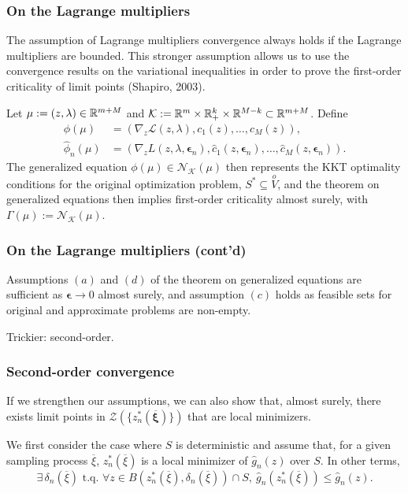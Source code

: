 \documentclass{beamer}
\def\bxi{\boldsymbol\xi}
\def\bepsilon{\boldsymbol\epsilon}
\begin{document}
\begin{frame}
\frametitle{On the Lagrange multipliers}

The assumption of Lagrange multipliers convergence always holds if the Lagrange multipliers are bounded.
This stronger assumption allows us to use the convergence results on the variational inequalities in order to prove the first-order criticality of limit points (Shapiro, 2003).

\mbox{}

Let $\mu := (z,\lambda) \in \mathbb{R}^{m+M}$ and $\mathcal{K} := \mathbb{R}^m
\times \mathbb{R}^k_+ \times \mathbb{R}^{M-k} \subset \mathbb{R}^{m+M}$.
Define
\begin{align*}
\phi(\mu) &= \left( \nabla_z \mathcal{L}(z, \lambda), c_1(z),
\ldots, c_M(z) \right),\\
\hat{\phi}_n(\mu) &= \left( \nabla_z L(z, \lambda, \bepsilon_n),
\hat{c}_1(z, \bepsilon_n), \ldots, \hat{c}_{M}(z,
\bepsilon_n)\right).
\end{align*}
The generalized equation $\phi(\mu) \in \mathcal{N}_{\mathcal{K}}(\mu)$ then represents the KKT optimality conditions for the original optimization problem, $S^* \subseteq \overset{o}{V}$, and the theorem on generalized equations then implies first-order criticality almost surely, with $\Gamma(\mu) := \mathcal{N}_{\mathcal{K}}(\mu)$.

\end{frame}

\begin{frame}
\frametitle{On the Lagrange multipliers (cont'd)}

Assumptions $(a)$ and $(d)$ of the theorem on generalized equations are sufficient as $\bepsilon \rightarrow 0$ almost surely, and assumption $(c)$ holds as feasible sets for original and approximate problems are non-empty.

\mbox{}

Trickier: second-order.

\end{frame}

\begin{frame}
\frametitle{Second-order convergence}

If we strengthen our assumptions, we can also show that, almost surely, there exists limit points in $\mathcal{Z}\left(\lbrace z^*_n(\overline{\bxi})\rbrace\right)$ that are local minimizers.

\mbox{}

We first consider the case where $S$ is deterministic and assume that, for a given sampling process $\overline{\xi}$, $z_n^*(\overline{\xi})$ is a local minimizer of $\hat{g}_n(z)$ over $S$.
In other terms,
\[
\exists\, \delta_n(\overline{\xi}) \text{ t.q. } \forall z \in
B \left( z_n^*(\overline{\xi}), \delta_n(\overline{\xi}) \right) \cap
S,\ \hat{g}_n \left( z_n^*(\overline{\xi}) \right) \leq \hat{g}_n(z).
\]

\end{frame}
\end{document}
